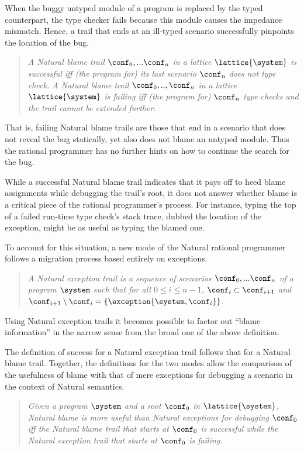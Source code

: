 When the buggy untyped module of a program is replaced by the typed counterpart,
the type checker fails because this module causes the impedance mismatch. Hence, a
trail that ends at an ill-typed scenario successfully pinpoints the location of
the bug. 
\begin{quote}
\it A Natural blame trail $\conf_0,...\conf_n$ in a lattice $\lattice{\system}$ is
\emph{successful} iff (the program for) its last scenario $\conf_n$ does not type check.  A Natural
blame trail $\conf_0,..,\conf_n$ in a lattice $\lattice{\system}$ is \emph{failing}
iff (the program for) $\conf_n$ type checks and the trail cannot be extended further.
\end{quote}
That is, failing Natural blame trails are those that end in a scenario that does not reveal the bug statically, yet also does not blame
an untyped module. Thus the rational programmer has
no further hints on how to continue the search for the bug.

While a successful Natural blame trail indicates that it 
pays off to heed blame assignments while debugging the trail's root, it does not answer whether
blame is a critical piece of the rational programmer's process.  For instance,
typing the top of a failed run-time type check's stack trace, dubbed the
location of the exception, might be as useful as typing the blamed one.

To account for this situation, a new mode of the Natural rational
programmer follows a migration process based entirely on exceptions.
\begin{quote}
\it A {\em Natural exception trail\/} is a sequence of scenarios $\conf_0,...\conf_n$ of a
program $\system$ such that for all $0 \leq i \leq n - 1$, $\conf_i \subset
\conf_{i+1}$ and $\conf_{i+1} \setminus \conf_i = \{\exception{\system, \conf_i}\}$.
\end{quote}
Using Natural exception trails it becomes possible to factor out
``blame information'' in the narrow sense from the broad one of the
above definition. 


The definition of success for a Natural exception trail follows that for
a Natural blame trail.
Together, the definitions for the two modes allow the comparison of the usefulness of blame 
with that of mere exceptions for debugging a scenario in the context of Natural semantics.
\begin{quote}
\it 
  Given a program $\system$ and a root $\conf_0$ in $\lattice{\system}$,
  Natural blame is \emph{more useful} than Natural exceptions for
  debugging $\conf_0$ iff 
  the Natural blame trail 
  that starts at $\conf_0$ is successful while the Natural exception trail that
  starts at $\conf_0$ is failing.
\end{quote}
